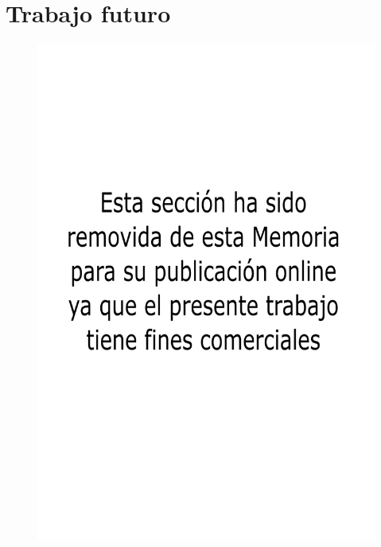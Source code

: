 \section{Trabajo futuro}
\label{sec:trabajo_futuro}

\begin{figure}[!h]
	\centering
	\includegraphics[width=14cm]{./Figures/comercial.png}
\end{figure}

